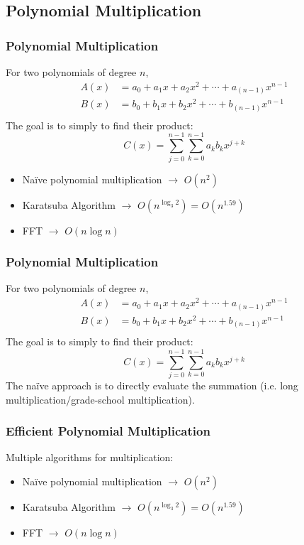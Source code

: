 \documentclass[
	11pt, %
]{beamer}
\begin{document}

\subsection{Polynomial Multiplication}
\begin{frame}
    \frametitle{Polynomial Multiplication}
    For two polynomials of degree $n$, 
    \begin{align*}
        A(x) &= a_0 + a_1x + a_2x^2 + \cdots + a_(n-1)x^{n-1} \\
        B(x) &= b_0 + b_1x + b_2x^2 + \cdots + b_(n-1)x^{n-1} \\ 
    \end{align*}
    The goal is to simply to find their product:
    \[
        C(x) = \sum_{j=0}^{n-1}\sum_{k=0}^{n-1}a_kb_kx^{j+k} 
    \]

    \begin{itemize}
        \item Naïve polynomial multiplication $\longrightarrow$ $O(n^2)$
        \item Karatsuba Algorithm $\longrightarrow$ $O(n^{\log_3 2}) = O(n^{1.59})$
        \item FFT $\longrightarrow$ $O(n\log n)$
    \end{itemize}

\end{frame}


\begin{frame}
    \frametitle{Polynomial Multiplication}
    For two polynomials of degree $n$, 
    \begin{align*}
        A(x) &= a_0 + a_1x + a_2x^2 + \cdots + a_(n-1)x^{n-1} \\
        B(x) &= b_0 + b_1x + b_2x^2 + \cdots + b_(n-1)x^{n-1} \\ 
    \end{align*}
    The goal is to simply to find their product:
    \[
        C(x) = \sum_{j=0}^{n-1}\sum_{k=0}^{n-1}a_kb_kx^{j+k} 
    \]
    The naïve approach is to directly evaluate the summation 
    (i.e. long multiplication/grade-school multiplication).
\end{frame}


\begin{frame}
    \frametitle{Efficient Polynomial Multiplication}
    Multiple algorithms for multiplication:
    \begin{itemize}
        \item Naïve polynomial multiplication $\longrightarrow$ $O(n^2)$
        \item Karatsuba Algorithm $\longrightarrow$ $O(n^{\log_3 2}) = O(n^{1.59})$
        \item FFT $\longrightarrow$ $O(n\log n)$
    \end{itemize}
\end{frame}
\end{document}

